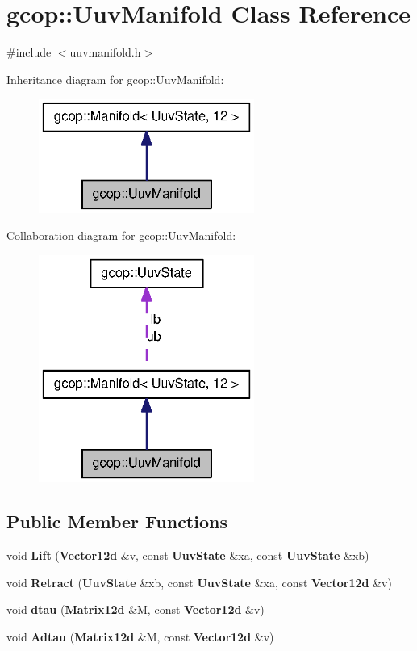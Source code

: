 \section{gcop\-:\-:\-Uuv\-Manifold \-Class \-Reference}
\label{classgcop_1_1UuvManifold}


{\ttfamily \#include $<$uuvmanifold.\-h$>$}



\-Inheritance diagram for gcop\-:\-:\-Uuv\-Manifold\-:\nopagebreak
\begin{figure}[H]
\begin{center}
\leavevmode
\includegraphics[width=200pt]{classgcop_1_1UuvManifold__inherit__graph}
\end{center}
\end{figure}


\-Collaboration diagram for gcop\-:\-:\-Uuv\-Manifold\-:\nopagebreak
\begin{figure}[H]
\begin{center}
\leavevmode
\includegraphics[width=200pt]{classgcop_1_1UuvManifold__coll__graph}
\end{center}
\end{figure}
\subsection*{\-Public \-Member \-Functions}
\begin{DoxyCompactItemize}
\item 
void {\bf \-Lift} ({\bf \-Vector12d} \&v, const {\bf \-Uuv\-State} \&xa, const {\bf \-Uuv\-State} \&xb)
\item 
void {\bf \-Retract} ({\bf \-Uuv\-State} \&xb, const {\bf \-Uuv\-State} \&xa, const {\bf \-Vector12d} \&v)
\item 
void {\bf dtau} ({\bf \-Matrix12d} \&\-M, const {\bf \-Vector12d} \&v)
\item 
void {\bf \-Adtau} ({\bf \-Matrix12d} \&\-M, const {\bf \-Vector12d} \&v)
\end{DoxyCompactItemize}
